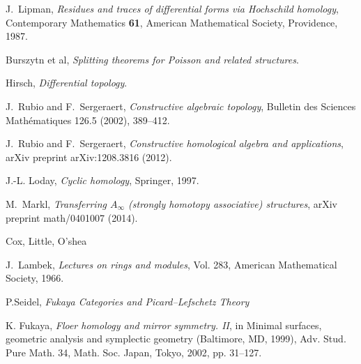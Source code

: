 \documentclass[english,letter paper,12pt,leqno]{article}
\theoremstyle{example}
\numberwithin{equation}{section}
\begin{document}
\begin{thebibliography}{BHLS03}
J.~Lipman, \textsl{Residues and traces of differential forms via {H}ochschild
  homology}, Contemporary Mathematics \textbf{61}, American Mathematical Society,
  Providence, 1987.

Burszytn et al, \textsl{Splitting theorems for Poisson and related structures}.

Hirsch, \textsl{Differential topology}.

J.~Rubio and F.~Sergeraert, \textsl{Constructive algebraic topology}, Bulletin des Sciences Math\'ematiques 126.5 (2002), 389--412.

J.~Rubio and F.~Sergeraert, \textsl{Constructive homological algebra and applications}, arXiv preprint arXiv:1208.3816 (2012).

J.-L. Loday, \textsl{Cyclic homology}, Springer, 1997.

M.~Markl, \textsl{Transferring $A_\infty$ (strongly homotopy associative) structures}, arXiv preprint math/0401007 (2014).

Cox, Little, O'shea

J.~Lambek, \textsl{Lectures on rings and modules}, Vol. 283, American Mathematical Society, 1966.

P.Seidel, \textsl{Fukaya Categories and Picard–Lefschetz Theory}

K. Fukaya, \textsl{Floer homology and mirror symmetry. II}, in Minimal surfaces, geometric analysis and symplectic geometry (Baltimore, MD, 1999), Adv. Stud. Pure Math. 34, Math. Soc. Japan, Tokyo, 2002, pp. 31–127.


\end{thebibliography}
\end{document}

